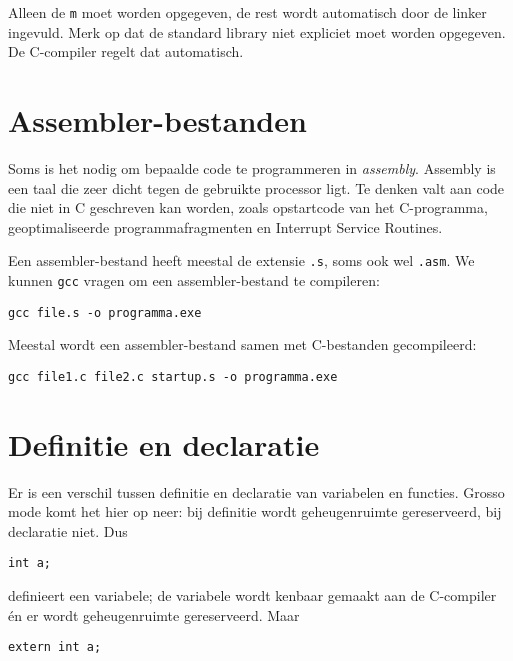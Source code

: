 Alleen de \texttt{m} moet worden opgegeven, de rest wordt automatisch door de linker ingevuld. Merk op dat de standard library niet expliciet moet worden opgegeven. De C-compiler regelt dat automatisch.


\section{Assembler-bestanden}
Soms is het nodig om bepaalde code te programmeren in \textit{assembly}. Assembly is een taal die zeer dicht tegen de gebruikte processor ligt. Te denken valt aan code die niet in C geschreven kan worden, zoals opstartcode van het C-programma, geoptimaliseerde programmafragmenten en Interrupt Service Routines.

Een assembler-bestand heeft meestal de extensie \texttt{.s}, soms ook wel \texttt{.asm}. We kunnen \texttt{gcc} vragen om een assembler-bestand te compileren:

\begin{lstlisting}[style=lstoneline]
gcc file.s -o programma.exe
\end{lstlisting}

Meestal wordt een assembler-bestand samen met C-bestanden gecompileerd:

\begin{lstlisting}[style=lstoneline]
gcc file1.c file2.c startup.s -o programma.exe
\end{lstlisting}


\section{Definitie en declaratie}
Er is een verschil tussen definitie en declaratie van variabelen en functies. Grosso mode komt het hier op neer: bij definitie wordt geheugenruimte gereserveerd, bij declaratie niet. Dus

\begin{lstlisting}[style=lstoneline]
int a;
\end{lstlisting}

definieert een variabele; de variabele wordt kenbaar gemaakt aan de C-compiler én er wordt geheugenruimte gereserveerd. Maar

\begin{lstlisting}[style=lstoneline]
extern int a;
\end{lstlisting}

